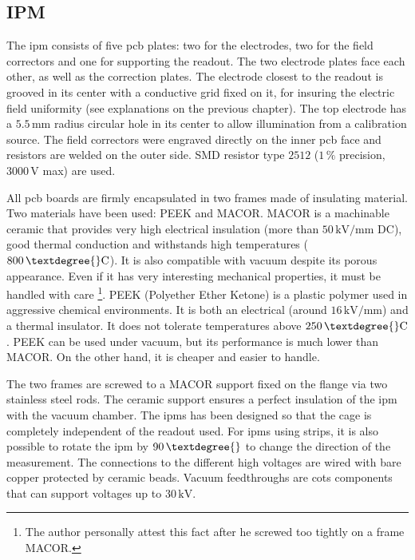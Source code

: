 \begin{refsection}
  \subsection{IPM}
  The \acrshort{ipm} consists of five \acrshort{pcb} plates: two for the electrodes, two for the field correctors and one for supporting the readout. The two electrode plates face each other, as well as the correction plates. The electrode closest to the readout is grooved in its center with a conductive grid fixed on it, for insuring the electric field uniformity (see explanations on the previous chapter). The top electrode has a $5.5\,\mathrm{mm}$ radius circular hole in its center to allow illumination from a calibration source. The field correctors were engraved directly on the inner \acrshort{pcb} face and resistors are welded on the outer side. SMD resistor type $2512$ ($1\,\mathrm{\%}$ precision, $3000\,\mathrm{V}$ max) are used.

  All \acrshort{pcb} boards are firmly encapsulated in two frames made of insulating material. Two materials have been used: PEEK and MACOR. MACOR is a machinable ceramic that provides very high electrical insulation (more than $50\,\mathrm{kV/mm}$ DC), good thermal conduction and withstands high temperatures ($800\,\mathrm{\textdegree{}C}$). It is also compatible with vacuum despite its porous appearance. Even if it has very interesting mechanical properties, it must be handled with care \footnote{The author personally attest this fact after he screwed too tightly on a frame MACOR.}. PEEK (Polyether Ether Ketone) is a plastic polymer used in aggressive chemical environments. It is both an electrical (around $16\,\mathrm{kV/mm}$) and a thermal insulator. It does not tolerate temperatures above $250\,\mathrm{\textdegree{}C}$. PEEK can be used under vacuum, but its performance is much lower than MACOR. On the other hand, it is cheaper and easier to handle.

  The two frames are screwed to a MACOR support fixed on the flange via two stainless steel rods. The ceramic support ensures a perfect insulation of the \acrshort{ipm} with the vacuum chamber. The \acrshort{ipm}s has been designed so that the cage is completely independent of the readout used. For \acrshort{ipm}s using strips, it is also possible to rotate the \acrshort{ipm} by $90\,\textdegree{}$ to change the direction of the measurement. The connections to the different high voltages are wired with bare copper protected by ceramic beads. Vacuum feedthroughs are \acrfull{cots} components that can support voltages up to $30\,\mathrm{kV}$.


\end{refsection}
